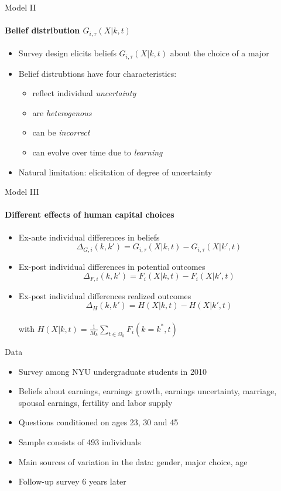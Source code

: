 \documentclass[12pt]{beamer}
\begin{document}
\begin{frame}{Model II}
    \framesubtitle{Belief distribution $G_{i,\tau}(X|k,t)$}
    \begin{itemize}
        \item Survey design elicits beliefs $G_{i,\tau}(X|k,t)$ about the choice of a major
        \item Belief distrubtions have four characteristics:
        \begin{itemize}
            \item reflect individual \textit{uncertainty}
            \item are \textit{heterogenous}
            \item can be \textit{incorrect}
            \item can evolve over time due to \textit{learning}
        \end{itemize}
        \item Natural limitation: elicitation of degree of uncertainty
    \end{itemize}
\end{frame}

\begin{frame}{Model III}
    \framesubtitle{Different effects of human capital choices}
    \begin{itemize}
        \item Ex-ante individual differences in beliefs
        $$ \Delta_{G,i}(k,k') = G_{i,\tau}(X|k,t) - G_{i,\tau}(X|k',t) $$
        \item Ex-post individual differences in potential outcomes
        $$ \Delta_{F,i}(k,k') = F_i(X|k,t) - F_i(X|k',t) $$
        \item Ex-post individual differences realized outcomes
        $$ \Delta_{H}(k,k') = H(X|k,t) - H(X|k',t) $$ \\
        with $H(X|k,t) = \frac{1}{M_k} \sum_{t \in \Omega_k} F_i(k = k^*,t)$
    \end{itemize}
    
\end{frame}

\begin{frame}{Data}
    \begin{itemize}
        \item Survey among NYU undergraduate students in 2010
        \item Beliefs about earnings, earnings growth, earnings uncertainty, marriage, spousal earnings, fertility and labor supply
        \item Questions conditioned on ages 23, 30 and 45
        \item Sample consists of 493 individuals
        \item Main sources of variation in the data: gender, major choice, age
        \item Follow-up survey 6 years later
    \end{itemize}
\end{frame}
\end{document}
